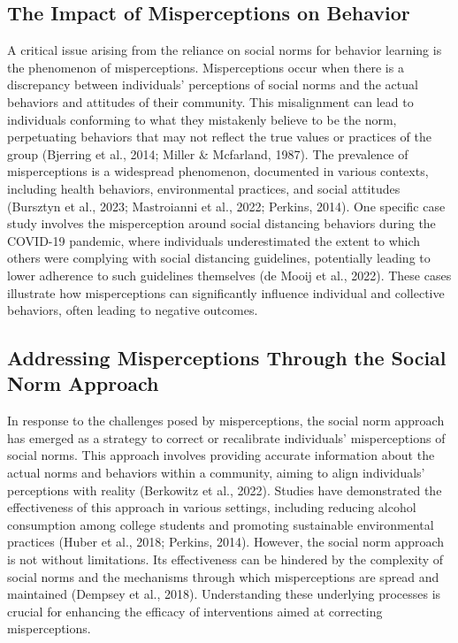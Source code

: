 \documentclass{article}
\begin{document}
\subsection*{The Impact of Misperceptions on Behavior}
A critical issue arising from the reliance on social norms for behavior learning is the phenomenon of misperceptions. Misperceptions occur when there is a discrepancy between individuals' perceptions of social norms and the actual behaviors and attitudes of their community. This misalignment can lead to individuals conforming to what they mistakenly believe to be the norm, perpetuating behaviors that may not reflect the true values or practices of the group (Bjerring et al., 2014; Miller & Mcfarland, 1987). The prevalence of misperceptions is a widespread phenomenon, documented in various contexts, including health behaviors, environmental practices, and social attitudes (Bursztyn et al., 2023; Mastroianni et al., 2022; Perkins, 2014). One specific case study involves the misperception around social distancing behaviors during the COVID-19 pandemic, where individuals underestimated the extent to which others were complying with social distancing guidelines, potentially leading to lower adherence to such guidelines themselves (de Mooij et al., 2022). These cases illustrate how misperceptions can significantly influence individual and collective behaviors, often leading to negative outcomes.

\subsection*{Addressing Misperceptions Through the Social Norm Approach}
In response to the challenges posed by misperceptions, the social norm approach has emerged as a strategy to correct or recalibrate individuals' misperceptions of social norms. This approach involves providing accurate information about the actual norms and behaviors within a community, aiming to align individuals' perceptions with reality (Berkowitz et al., 2022). Studies have demonstrated the effectiveness of this approach in various settings, including reducing alcohol consumption among college students and promoting sustainable environmental practices (Huber et al., 2018; Perkins, 2014). However, the social norm approach is not without limitations. Its effectiveness can be hindered by the complexity of social norms and the mechanisms through which misperceptions are spread and maintained (Dempsey et al., 2018). Understanding these underlying processes is crucial for enhancing the efficacy of interventions aimed at correcting misperceptions.
\end{document}
